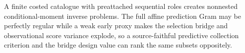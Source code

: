A finite costed catalogue with preattached sequential roles creates nonnested conditional-moment inverse problems. The full affine prediction Gram may be perfectly regular while a weak early proxy makes the selection bridge and observational score variance explode, so a source-faithful predictive collection criterion and the bridge design value can rank the same subsets oppositely.